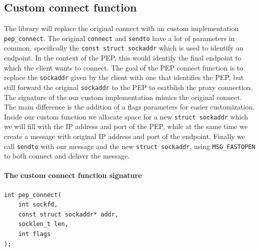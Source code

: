 \documentclass[a4paper,english, 11pt]{report}
\begin{document}
\subsection{Custom connect function}
The library will replace the original connect with an custom implementation \verb|pep_connect|. The original \verb|connect| and \verb|sendto| have a lot of parameters in common, specifically the \verb|const struct sockaddr| which is used to identify an endpoint. In the context of the PEP, this would identify the final endpoint to which the client wants to connect. The goal of the PEP connect function is to replace the \verb|sockaddr| given by the client with one that identifies the PEP, but still forward the original \verb|sockaddr| to the PEP to esatblish the proxy connection.\\

The signature of the our custom implementation mimics the original connect. The main difference is the addition of a flags parameters for easier customization. Inside our custom function we allocate space for a new \verb|struct sockaddr| which we will fill with the IP address and port of the PEP, while at the same time we create a message with original IP address and port of the endpoint. Finally we call \verb|sendto| with our message and the new \verb|struct sockaddr|, using \verb|MSG_FASTOPEN| to both connect and deliver the message.\\

\noindent\begin{minipage}{\linewidth}
\paragraph{The custom connect function signature}
\begin{verbatim}
int pep_connect(
    int sockfd,
    const struct sockaddr* addr,
    socklen_t len,
    int flags
);
\end{verbatim}
\end{minipage}


%
%    
%
%    
%
\end{document}
